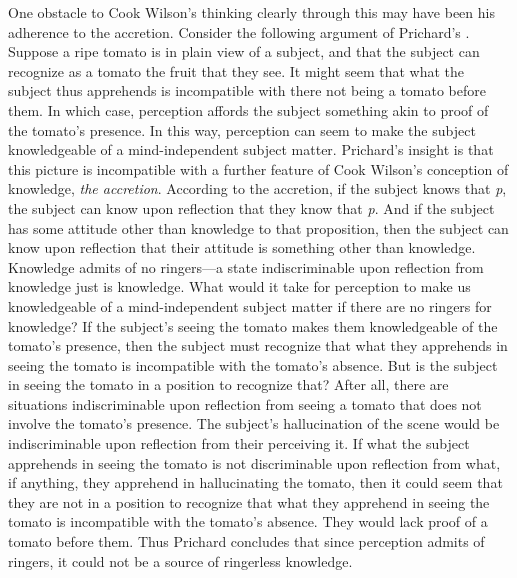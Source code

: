 \documentclass[12pt]{article}
\begin{document}
One obstacle to Cook Wilson's thinking clearly through this may have been his adherence to the accretion. Consider the following argument of Prichard's \citeyearpar[11]{Prichard:1938ve}. Suppose a ripe tomato is in plain view of a subject, and that the subject can recognize as a tomato the fruit that they see. It might seem that what the subject thus apprehends is incompatible with there not being a tomato before them. In which case, perception affords the subject something akin to proof of the tomato's presence. In this way, perception can seem to make the subject knowledgeable of a mind-independent subject matter. Prichard's insight is that this picture is incompatible with a further feature of Cook Wilson's conception of knowledge, \emph{the accretion}. According to the accretion, if the subject knows that \emph{p}, the subject can know upon reflection that they know that \emph{p}. And if the subject has some attitude other than knowledge to that proposition, then the subject can know upon reflection that their attitude is something other than knowledge. Knowledge admits of no ringers---a state indiscriminable upon reflection from knowledge just is knowledge. What would it take for perception to make us knowledgeable of a mind-independent subject matter if there are no ringers for knowledge? If the subject's seeing the tomato makes them knowledgeable of the tomato's presence, then the subject must recognize that what they apprehends in seeing the tomato is incompatible with the tomato's absence. But is the subject in seeing the tomato in a position to recognize that? After all, there are situations indiscriminable upon reflection from seeing a tomato that does not involve the tomato's presence. The subject's hallucination of the scene would be indiscriminable upon reflection from their perceiving it. If what the subject apprehends in seeing the tomato is not discriminable upon reflection from what, if anything, they apprehend in hallucinating the tomato, then it could seem that they are not in a position to recognize that what they apprehend in seeing the tomato is incompatible with the tomato's absence. They would lack proof of a tomato before them. Thus Prichard concludes that since perception admits of ringers, it could not be a source of ringerless knowledge.
\end{document}

